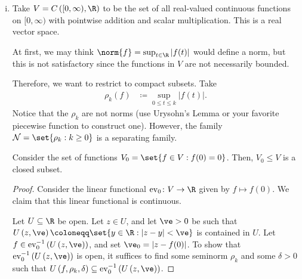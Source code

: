 \documentclass[10pt]{mypackage}
\renewcommand{\coloneq}{\coloneqq}
\begin{document}
\begin{enumerate}[(i)]
    We define the seminorms 
    \begin{align*}
      \rho_{k}(x) &= \sup_{n\geq 0} \left\langle n \right\rangle^{k} \left\vert x_n \right\vert.
    \end{align*}
    In fact, the $\set{\rho_k : k\in \N}$ are norms. Let
    \begin{align*}
      \mathcal{N}\coloneq \set{\rho_k : k\in \N}
    \end{align*}
    We obtain a locally convex on $s\left( \N,\K \right)$ with topology induced by the family $ \mathcal{N} $.

    Later, we will see that $ \left( s\left( \N,\K \right), \mathcal{T}\left( \mathcal{N} \right) \right) $ is \textit{not} a normed space. That is, there does not exist a norm $\norm{\cdot}$ such that $ \mathcal{T}\left( \mathcal{N} \right) = \mathcal{T}\left( \set{\norm{\cdot}} \right) $.
  \item Take $V = C\left( [0,\infty),\R \right)$ to be the set of all real-valued continuous functions on $[0,\infty)$ with pointwise addition and scalar multiplication. This is a real vector space.

    At first, we may think $\norm{f} = \sup_{t\in \R}\left\vert f(t) \right\vert$ would define a norm, but this is not satisfactory since the functions in $V$ are not necessarily bounded.

    Therefore, we want to restrict to compact subsets. Take
    \begin{align*}
      \rho_k(f) &\coloneq \sup_{0\leq t \leq k} \left\vert f(t) \right\vert.
    \end{align*}
    Notice that the $\rho_k$ are not norms (use Urysohn's Lemma or your favorite piecewise function to construct one). However, the family $\mathcal{N} = \set{\rho_k : k\geq 0}$ is a separating family.

    Consider the set of functions $V_0 = \set{f\in V : f(0) = 0}$. Then, $V_0\leq V$ is a closed subset.
    \begin{proof}
      Consider the linear functional $ \operatorname{ev}_0\colon V\rightarrow \R $ given by $f\mapsto f(0)$. We claim that this linear functional is continuous.

      Let $U\subseteq \R$ be open. Let $z\in U$, and let $\ve > 0$ be such that $U\left( z,\ve \right)\coloneq \set{y\in \R : \left\vert z-y \right\vert < \ve}$ is contained in $U$. Let $f\in \operatorname{ev}_0^{-1}\left( U\left( z,\ve \right) \right)$, and set $\ve_0 = \left\vert z - f(0) \right\vert$. To show that $ \operatorname{ev}_{0}^{-1}\left( U\left( z,\ve \right) \right) $ is open, it suffices to find some seminorm $\rho_k$ and some $\delta > 0$ such that $U\left( f,\rho_k,\delta \right)\subseteq \operatorname{ev}_0^{-1}\left( U\left( z,\ve \right) \right)$.


\end{proof}
\end{enumerate}
\end{document}
